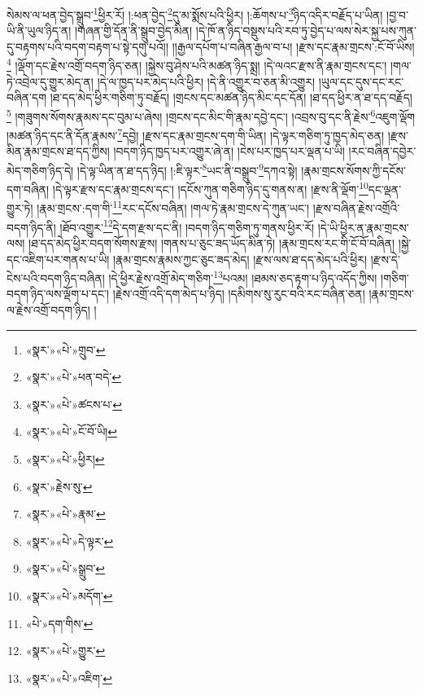 སེམས་ལ་ཕན་བྱེད་སྒྲུབ་\footnote{«སྣར་»«པེ་»གྲུབ་}ཕྱིར་རོ། །:ཕན་བྱེད་\footnote{«སྣར་»«པེ་»ཕན་བདེ་}དུ་མ་སྨོས་པའི་ཕྱིར། །:ཆོགས་པ་\footnote{«སྣར་»«པེ་»ཚངས་པ་}ཉིད་འདིར་བརྗོད་པ་ཡིན། །བྱ་བ་ཡི་ནི་ཡུལ་ཉིད་ན། །གཞན་གྱི་དོན་ནི་སྒྲུབ་བྱེད་མིན། །དེ་ཁོ་ན་ཉིད་བསྡུས་པའི་རབ་ཏུ་བྱེད་པ་ལས་སེར་སྐྱ་པས་ཀུན་དུ་བརྟགས་པའི་བདག་བརྟག་པ་སྟེ་དགུ་པའོ།། །།རྒྱལ་དཔོག་པ་བཞིན་རྒྱལ་བ་པ། །རྫས་དང་རྣམ་གྲངས་:ངོ་བོ་ཡིས།\footnote{«སྣར་»«པེ་»ངོ་བོ་ཡི།} །ལྡོག་དང་རྗེས་འགྲོ་བདག་ཉིད་ཅན། །སྐྱེས་བུ་ཤེས་པའི་མཚན་ཉིད་སྨྲ། །དེ་ལའང་རྫས་ནི་རྣམ་གྲངས་དང་། །གལ་ཏེ་འབྲེལ་དུ་གྱུར་མེད་ན། །དེ་ལ་ཁྱད་པར་མེད་པའི་ཕྱིར། །དེ་ནི་འགྱུར་བ་ཅན་མི་འགྱུར། །ཡུལ་དང་དུས་དང་རང་བཞིན་དག །ཐ་དད་མེད་ཕྱིར་གཅིག་ཏུ་བརྗོད། །གྲངས་དང་མཚན་ཉིད་མིང་དང་དོན། །ཐ་དད་ཕྱིར་ན་ཐ་དད་བརྗོད།\footnote{«སྣར་»«པེ་»ཕྱིར།} །གཟུགས་སོགས་རྣམས་དང་བུམ་པ་ཞེས། །གྲངས་དང་མིང་གི་རྣམ་དབྱེ་དང་། །འབྲས་བུ་དང་ནི་རྗེས་\footnote{«སྣར་»རྗེས་སུ་}འཇུག་ལྡོག །མཚན་ཉིད་དང་ནི་དོན་རྣམས་\footnote{«སྣར་»«པེ་»རྣམ་}དབྱེ། །རྫས་དང་རྣམ་གྲངས་དག་གི་ཡིན། །དེ་ལྟར་གཅིག་ཏུ་ཁྱད་མེད་ཅན། །རྫས་མིན་རྣམ་གྲངས་ཐ་དད་ཀྱིས། །བདག་ཉིད་ཁྱད་པར་འགྱུར་ཞེ་ན། །ངེས་པར་ཁྱད་པར་ལྡན་པ་ཡི། །རང་བཞིན་དབྱེར་མེད་གཅིག་ཉིད་དེ། །དེ་ལྟ་ཡིན་ན་ཐ་དད་ཉིད། །:ཇི་ལྟར་\footnote{«སྣར་»«པེ་»དེ་ལྟར་}ཡང་ནི་བསྒྲུབ་\footnote{«སྣར་»«པེ་»སྒྲུབ་}དཀའ་སྟེ། །རྣམ་གྲངས་སོགས་ཀྱི་དངོས་དག་བཞིན། །དེ་ལྟར་རྫས་དང་རྣམ་གྲངས་དང་། །དངོས་ཀུན་གཅིག་ཉིད་དུ་གནས་ན། །རྫས་ནི་ལྡོག་\footnote{«སྣར་»«པེ་»མདོག་}དང་ལྡན་གྱུར་ཏེ། །རྣམ་གྲངས་:དག་གི་\footnote{«པེ་»དག་གིས་}རང་དངོས་བཞིན། །གལ་ཏེ་རྣམ་གྲངས་དེ་ཀུན་ཡང་། །རྫས་བཞིན་རྗེས་འགྲོའི་བདག་ཉིད་ནི། །ཐོབ་འགྱུར་\footnote{«སྣར་»«པེ་»གྱུར་}དེ་དག་རྫས་དང་ནི། །བདག་ཉིད་གཅིག་ཏུ་གནས་ཕྱིར་རོ། །དེ་ཡི་ཕྱིར་ན་རྣམ་གྲངས་ལས། །ཐ་དད་མེད་ཕྱིར་བདག་སོགས་རྫས། །གནས་པ་ཅུང་ཟད་ཡོད་མིན་ཏེ། །རྣམ་གྲངས་རང་གི་ངོ་བོ་བཞིན། །སྐྱེ་དང་འཇིག་པར་གནས་པ་ཡི། །རྣམ་གྲངས་རྣམས་ཀྱང་ཅུང་ཟད་མེད། །རྫས་ལས་ཐ་དད་མེད་པའི་ཕྱིར། །རྫས་དེ་ངེས་པའི་བདག་ཉིད་བཞིན། །དེ་ཕྱིར་རྗེས་འགྲོ་མེད་གཅིག་\footnote{«སྣར་»«པེ་»འཇིག་}པའམ། །ཐམས་ཅད་རྟག་པ་ཉིད་འདོད་ཀྱིས། །གཅིག་བདག་ཉིད་ལས་ལྡོག་པ་དང་། །རྗེས་འགྲོ་འདི་དག་མེད་པ་ཉིད། །དམིགས་སུ་རུང་བའི་རང་བཞིན་ཅན། །རྣམ་གྲངས་ལ་རྗེས་འགྲོ་བདག་ཉིད། །
